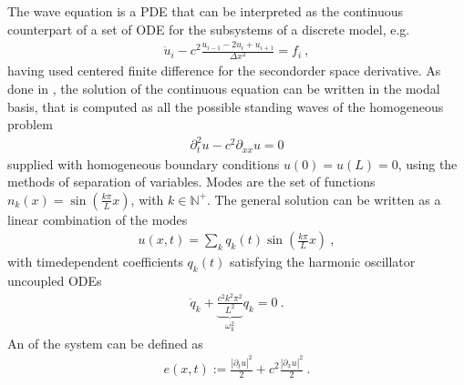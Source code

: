 \documentclass[letterpaper,10pt,english]{jupyterBook}
\begin{document}
\sphinxAtStartPar
The wave equation is a PDE that can be interpreted as the continuous counter\sphinxhyphen{}part of a set of ODE for the sub\sphinxhyphen{}systems of a discrete model, e.g.
\begin{equation*}
\begin{split}
\ddot u_i-c^2\frac{u_{i-1}-2u_i+u_{i+1}}{\Delta x^2}=f_i \ ,
\end{split}
\end{equation*}
\sphinxAtStartPar
having used centered finite difference for the second\sphinxhyphen{}order space derivative.
As done in , the solution of the continuous equation can be written in the modal basis, that is computed as all the possible standing waves of the homogeneous problem
\begin{equation*}
\begin{split}
\partial_t^2u-c^2\partial_{xx}u=0
\end{split}
\end{equation*}
\sphinxAtStartPar
supplied with homogeneous boundary conditions \(u(0) = u(L) = 0\), using the methods of separation of variables. Modes are the set of functions
\(n_k(x) = \sin \left( \frac{k \pi}{L} x \right)\), with \(k \in \mathbb{N}^+\). The general solution can be written as a linear combination of the modes
\begin{equation*}
\begin{split}
u(x,t)=\sum_k q_k(t)\sin\!\left(\frac{k\pi}{L}x\right) \ ,
\end{split}
\end{equation*}
\sphinxAtStartPar
with time\sphinxhyphen{}dependent coefficients \(q_k(t)\) satisfying the harmonic oscillator uncoupled ODEs
\begin{equation}\label{equation:ch/quantum-mechanics/qft/field-quantization:eq:field-quantization:classical:mode-ode}
\begin{split}
\ddot q_k+\underbrace{\frac{c^2k^2\pi^2}{L^2}}_{\omega_k^2}q_k=0 \ .
\end{split}
\end{equation}
\sphinxAtStartPar
An  of the system can be defined as
\begin{equation*}
\begin{split}e(x,t) :=  \frac{|\partial_t u|^2}{2} + c^2 \frac{|\partial_x u|^2}{2} \ .\end{split}
\end{equation*}
\end{document}
